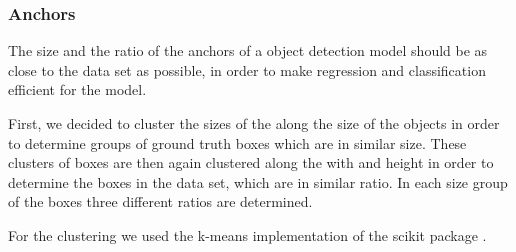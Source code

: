 \documentclass{article}
\begin{document}
\subsubsection*{Anchors}

The size and the ratio of the anchors of a object detection model should be as close to the data set as possible, in order to make regression and classification efficient for the model.

First, we decided to cluster the sizes of the along the size of the objects in order to determine groups of ground truth boxes which are in similar size. These clusters of boxes are then again clustered along the with and height in order to determine the boxes in the data set, which are in similar ratio. In each size group of the boxes three different ratios are determined.

For the clustering we used the k-means implementation of the scikit package \cite{scikit-learn}.
\end{document}
